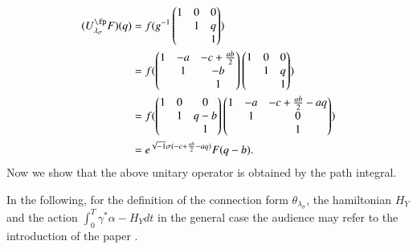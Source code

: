 \begin{align*}
(U_{\lambda_{\sigma}}^{\fp}F)(q)&= f(g^{-1}\begin{pmatrix}
1 & 0 & 0\\
  & 1 & q\\
  &   & 1
\end{pmatrix})\\
& =f(\begin{pmatrix}
1 & -a & -c+\frac{ab}{2}\\
  & 1 & -b\\
  &   & 1
\end{pmatrix}
\begin{pmatrix}
1 & 0 & 0\\
  & 1 & q\\
  &   & 1
\end{pmatrix}
)\\
& =f(
\begin{pmatrix}
1 & 0 & 0\\
  & 1 & q-b\\
  &   & 1
\end{pmatrix}
\begin{pmatrix}
1 & -a & -c+\frac{ab}{2}-aq\\
  & 1 & 0\\
  &   & 1
\end{pmatrix}
) \\
&= e^{\sqrt{-1}\sigma(-c +\frac{ab}{2}-aq)}F(q-b).
\end{align*}
 Now we show that the above unitary operator is obtained by the path integral.

 In the following, for the definition of the connection form $\theta_{\lambda_{\sigma}}$, the hamiltonian $H_{Y}$ and the action $\int_{0}^{T}\gamma^{*}\alpha-H_{Y}dt$ in the general case the audience may refer to the introduction of the paper \cite{chap15-key5}.

